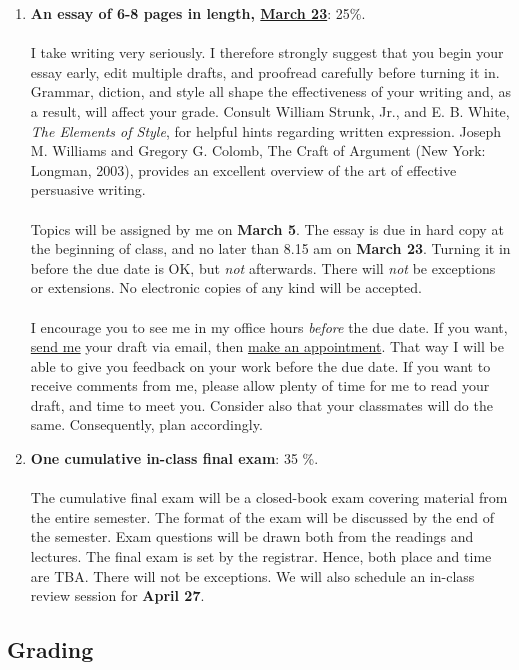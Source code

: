 \documentclass[letterpaper]{article}
\begin{document}
\begin{enumerate}
	\item {\bf An essay of 6-8 pages in length, \underline{March 23}}: 25\%. 
	\\
	\\
	I take writing very seriously. I therefore strongly suggest that you begin your essay early, edit multiple drafts, and proofread carefully before turning it in. Grammar, diction, and style all shape the effectiveness of your writing and, as a result, will affect your grade. Consult William Strunk, Jr., and E. B. White, \emph{The Elements of Style}, for helpful hints regarding written expression. Joseph M. Williams and Gregory G. Colomb, The Craft of Argument (New York: Longman, 2003), provides an excellent overview of the art of effective persuasive writing.
	\\
	\\
	Topics will be assigned by me on {\bf March 5}. The essay is due in hard copy at the beginning of class, and no later than 8.15 am on {\bf March 23}. Turning it in before the due date is OK, but \emph{not} afterwards. There will \emph{not} be exceptions or extensions. No electronic copies of any kind will be accepted.
	\\
	\\
	I encourage you to see me in my office hours \emph{before} the due date. If you want, \href{mailto:\filetext}{send me} your draft via email, then \href{https://calendly.com/bahamonde/officehours}{make an appointment}. That way I will be able to give you feedback on your work before the due date. If you want to receive comments from me, please allow plenty of time for me to read your draft, and time to meet you. Consider also that your classmates will do the same. Consequently, plan accordingly.

	\item {\bf One cumulative in-class final exam}: 35 \%. 
	\\
	\\
	The cumulative final exam will be a closed-book exam covering material from the entire semester. The format of the exam will be discussed by the end of the semester. Exam questions will be drawn both from the readings and lectures. The final exam is set by the registrar. Hence, both place and time are TBA. There will not be exceptions. We will also schedule an in-class review session for {\bf April 27}.

\end{enumerate}




\subsection*{Grading}
\end{document}
